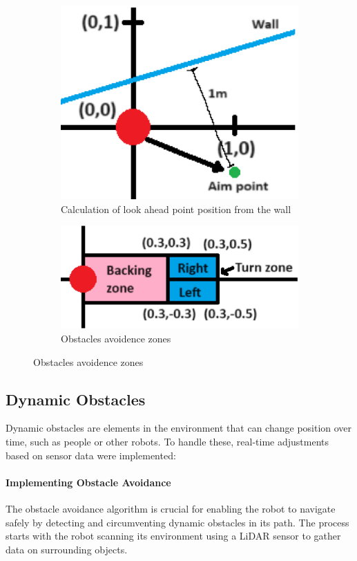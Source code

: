 \documentclass{article}
\begin{document}
	\begin{figure}[!h]
		\begin{subfigure}{0.45\textwidth}
			\centering
			\includegraphics[width=.6\textwidth]{fig/fig13.png}
			\caption{Calculation of look ahead point position from the wall}
		\end{subfigure}
		\hfill
		\begin{subfigure}{0.45\textwidth}
			\centering
			\includegraphics[width=.6\textwidth]{fig/fig14.png}
			\caption{Obstacles avoidence zones}
		\end{subfigure}
	\end{figure}
	
	\subsection{Dynamic Obstacles}
	Dynamic obstacles are elements in the environment that can change position over time, such as people or other robots. To handle these, real-time adjustments based on sensor data were implemented:
	
	\paragraph{Implementing Obstacle Avoidance}
	The obstacle avoidance algorithm is crucial for enabling the robot to navigate safely by detecting and circumventing dynamic obstacles in its path. The process starts with the robot scanning its environment using a LiDAR sensor to gather data on surrounding objects.
	\\\\
\end{document}
